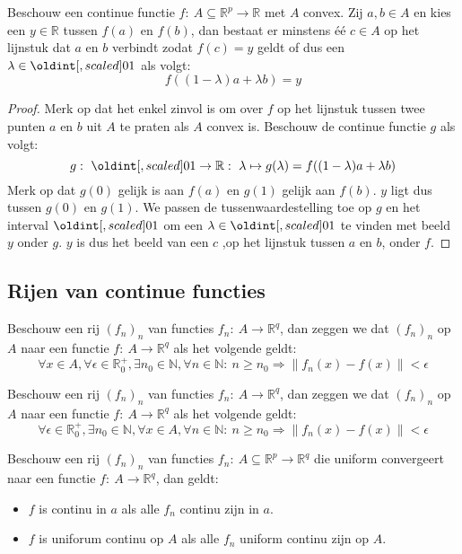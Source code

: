 \documentclass[main.tex]{subfiles}
\begin{document}
\begin{pr}
  Beschouw een continue functie $f:\ A \subseteq \mathbb{R}^{p} \rightarrow \mathbb{R}$ met $A$ convex.
  Zij $a,b\in A$ en kies een $y\in \mathbb{R}$ tussen $f(a)$ en $f(b)$, dan bestaat er minstens \'e\'e $c\in A$ op het lijnstuk dat $a$ en $b$ verbindt zodat $f(c) = y$ geldt of dus een $\lambda \in \interval{0}{1}$ als volgt:
  \[ f((1-\lambda)a+\lambda b) = y \]

  \begin{proof}
    Merk op dat het enkel zinvol is om over $f$ op het lijnstuk tussen twee punten $a$ en $b$ uit $A$ te praten als $A$ convex is.
    Beschouw de continue functie $g$ als volgt:
    \[ g:\ \interval{0}{1} \rightarrow \mathbb{R}:\ \lambda \mapsto g(\lambda) = f((1-\lambda)a+\lambda b) \]
    Merk op dat $g(0)$ gelijk is aan $f(a)$ en $g(1)$ gelijk aan $f(b)$.
    $y$ ligt dus tussen $g(0)$ en $g(1)$.
    We passen de tussenwaardestelling toe op $g$ en het interval $\interval{0}{1}$ om een $\lambda\in \interval{0}{1}$ te vinden met beeld $y$ onder $g$.
    $y$ is dus het beeld van een $c$ ,op het lijnstuk tussen $a$ en $b$, onder $f$.
  \end{proof}
\end{pr}


\subsection{Rijen van continue functies}
\label{sec:rijen-van-continue}

\begin{de}
  Beschouw een rij $(f_{n})_{n}$ van functies $f_{n}:\ A \rightarrow \mathbb{R}^{q}$, dan zeggen we dat $(f_{n})_{n}$  op $A$ naar een functie $f:\ A \rightarrow \mathbb{R}^{q}$ als het volgende geldt:
  \[ \forall x\in A, \forall \epsilon \in \mathbb{R}_{0}^{+}, \exists n_{0} \in \mathbb{N}, \forall n \in \mathbb{N}:\ n \ge n_{0} \Rightarrow \|f_{n}(x) -f(x)\| < \epsilon \]
\end{de}

\begin{de}
  Beschouw een rij $(f_{n})_{n}$ van functies $f_{n}:\ A \rightarrow \mathbb{R}^{q}$, dan zeggen we dat $(f_{n})_{n}$  op $A$ naar een functie $f:\ A \rightarrow \mathbb{R}^{q}$ als het volgende geldt:
  \[ \forall \epsilon \in \mathbb{R}_{0}^{+}, \exists n_{0} \in \mathbb{N}, \forall x\in A, \forall n \in \mathbb{N}:\ n \ge n_{0} \Rightarrow \|f_{n}(x) -f(x)\| < \epsilon \]
\end{de}

\begin{st}
  Beschouw een rij $(f_{n})_{n}$ van functies $f_{n}:\ A \subseteq \mathbb{R}^{p} \rightarrow \mathbb{R}^{q}$ die uniform convergeert naar een functie $f:\ A \rightarrow \mathbb{R}^{q}$, dan geldt:
  \begin{itemize}
  \item $f$ is continu in $a$ als alle $f_n$ continu zijn in $a$.
  \item $f$ is uniforum continu op $A$ als alle $f_n$ uniform continu zijn op $A$.
  \end{itemize}
\end{st}
\end{document}
